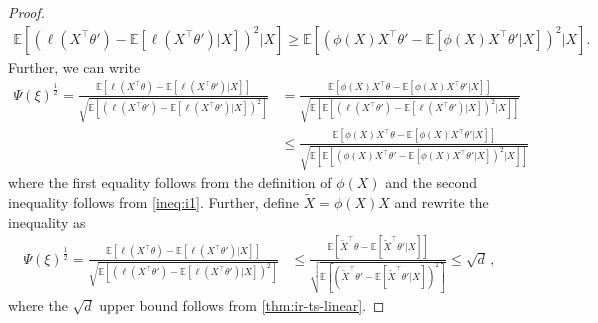 \documentclass[letter, 12pt]{report}
\newcommand{\E}{\mathbb E}
\newcommand{\1}{\mathbf{1}}
\theoremstyle{plain}
\theoremstyle{definition}
\theoremstyle{remark}
\begin{document}
\begin{proof}
    \begin{align}
        \E\left[
            \left(
            \ell(X^\top \theta') - \E[\ell(X^\top \theta')|X]
            \right)^2
            | X
            \right]
        \geq
        \E\left[
            \left(
            \phi(X) X^\top \theta' - \E[\phi(X)X^\top \theta'|X]
            \right)^2
            | X
            \right].
        \label{ineq:i1}
    \end{align}
    Further, we can write
    \begin{align*}
        \Psi(\xi)^{\tfrac{1}{2}} = \frac{
            \E\left[
                \ell(X^\top \theta) - \E[\ell(X^\top \theta')|X]
                \right]
        }{
            \sqrt{
                \E\left[
                    \left(\ell(X^\top \theta') - \E[\ell(X^\top \theta')|X]\right)^2
                    \right]
            }
        }
         & =
        \frac{
            \E\left[
                \phi(X)X^\top \theta - \E[\phi(X)X^\top \theta'|X]
                \right]
        }{
            \sqrt{
                \E\left[
                    \E\left[
                        \left(\ell(X^\top \theta') - \E[\ell(X^\top \theta')|X]\right)^2
                        |X
                        \right]
                    \right]
            }
        }
        \\
         & \leq
        \frac{
            \E\left[
                \phi(X)X^\top \theta - \E[\phi(X)X^\top \theta'|X]
                \right]
        }{
            \sqrt{
                \E\left[
                    \E\left[
                        \left(\phi(X)X^\top \theta' -
                        \E[\phi(X)X^\top \theta'|X]\right)^2
                        |X
                        \right]
                    \right]
            }
        }
    \end{align*}
    where the first equality follows from the
    definition of $\phi(X)$ and the second inequality follows from \ref{ineq:i1}.
    Further, define $\tilde{X} = \phi(X)X$ and
    rewrite the inequality as
    \begin{align*}
        \Psi(\xi)^{\tfrac{1}{2}} =
        \frac{
            \E\left[
                \ell(X^\top \theta) - \E[\ell(X^\top \theta')|X]
                \right]
        }{
            \sqrt{
                \E\left[
                    \left(\ell(X^\top \theta') - \E[\ell(X^\top \theta')|X]\right)^2
                    \right]
            }
        }
         & \leq
        \frac{
            \E\left[
                \tilde{X}^\top \theta - \E[\tilde{X}^\top \theta'|X]
                \right]
        }{
            \sqrt{
                \E\left[
                    \left(\tilde{X}^\top \theta' -
                    \E[\tilde{X}^\top \theta'|X]\right)^2
                    \right]
            }
        }
        \leq
        \sqrt{d}\,,
    \end{align*}
    where the $\sqrt{d}$ upper bound follows from \cref{thm:ir-ts-linear}.
\end{proof}
\end{document}
